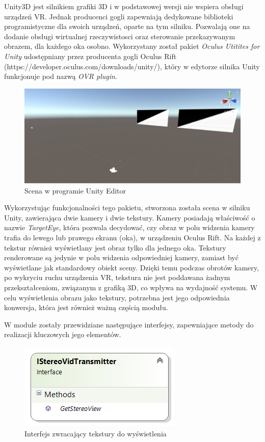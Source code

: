 \documentclass[a4paper,11pt,twoside]{report}
\theoremstyle{definition}
\begin{document}
Unity3D jest silnikiem grafiki 3D i w podstawowej wersji nie wspiera obsługi urządzeń VR. Jednak producenci gogli zapewniają dedykowane biblioteki programistyczne dla swoich urządzeń, oparte na tym silniku. Pozwalają one na dodanie obsługi wirtualnej rzeczywistosci oraz sterowanie przekazywanym obrazem, dla każdego oka osobno. Wykorzystany został pakiet \textit{Oculus Utitites for Unity} udostępniany przez producenta gogli Oculus Rift (https://developer.oculus.com/downloads/unity/), który w  edytorze silnika Unity funkcjonuje pod nazwą \textit{OVR plugin}.  \hfill \\

\begin{figure}[h]
\centering
\includegraphics[scale=0.5]{images/unityscene}
\caption[Scena Unity]{Scena w programie Unity Editor}
\end{figure}

Wykorzystując funkcjonalności tego pakietu, stworzona została scena w silniku Unity, zawierająca dwie kamery i dwie tekstury. Kamery posiadają właściwość o nazwie \textit{TargetEye}, która pozwala decydować, czy obraz w polu widzenia kamery trafia do lewego lub prawego ekranu (oka), w urządzeniu Oculus Rift. Na każdej z tekstur również wyświetlany jest obraz tylko dla jednego oka. Tekstury renderowane są jedynie w polu widzenia odpowiedniej kamery, zamiast być wyświetlane jak standardowy obiekt sceny. Dzięki temu podczas obrotów kamery, po wykryciu ruchu urządzenia VR, tekstura nie jest poddawana żadnym przekształceniom, związanym z grafiką 3D, co wpływa na wydajność systemu. W celu wyświetlenia obrazu jako tekstury, potrzebna jest jego odpowiednia konwersja, która jest również ważną częścią modułu.


W module zostały przewidziane następujące interfejsy, zapewniające metody do realizacji kluczowych jego elementów.

\begin{figure}[h]
\centering
\includegraphics[scale=0.9]{images/IStereoVidTransmitter}
\caption[Przekazywanie diagram]{Interfejs zwracający tekstury do wyświetlenia}
\end{figure}
\end{document}
